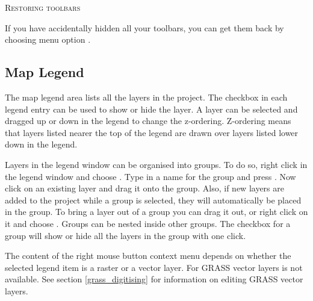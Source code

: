 \begin{Tip}
\caption{\textsc{Restoring toolbars}} 
If you have accidentally hidden all your toolbars, you can get them
back by choosing menu option  \arrow {}.
\end{Tip}

\subsection{Map Legend}\label{label_legend}

The map legend area lists all the layers in the project.
The checkbox in each legend entry can be used to show or hide the layer.
A layer can be selected and dragged up or down in the legend to change the
z-ordering. Z-ordering means that layers listed nearer the top of the legend are
drawn over layers listed lower down in the legend.

Layers in the legend window can be organised into groups. To do so, right click
in the legend window and choose . Type in a name for the
group and press . Now click on an existing layer and drag it
onto the group. Also, if new layers are added to the project while a group is
selected, they will automatically be placed in the group.
To bring a layer out of a group you can drag it out, or right click on it and 
choose .
Groups can be nested inside other groups.
The checkbox for a group will show or hide all the layers in the group
with one click.

The content of the right mouse button context menu depends on whether the selected legend item
is a raster or a vector layer. For GRASS vector layers  is not
available. See section \ref{grass_digitising} for information on editing GRASS vector layers.

